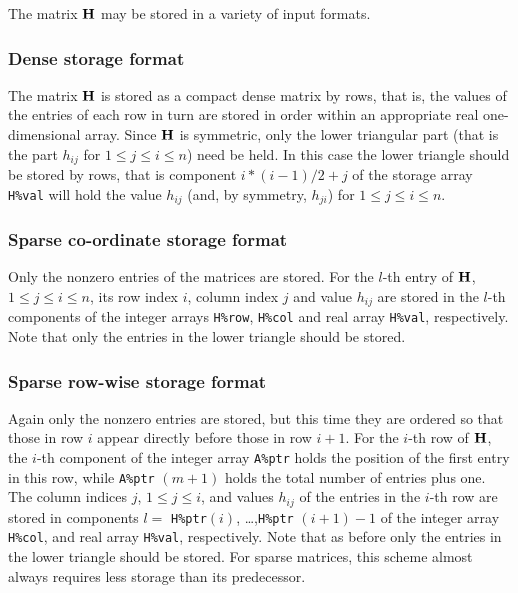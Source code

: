 \documentclass{galahad}
\begin{document}
\galmatrix
The matrix ${\mathbf{H}}$ may be stored in a variety of input formats.

\subsubsection{Dense storage format}\label{dense}
The matrix ${\mathbf{H}}$ is stored as a compact
dense matrix by rows, that is, the values of the entries of each row in turn are
stored in order within an appropriate real one-dimensional array.
Since ${\mathbf{H}}$ is symmetric, only the lower triangular part (that is the part
$h_{ij}$ for $1 \leq j \leq i \leq n$) need be held. In this case
the lower triangle should be stored by rows, that is
component $i \ast (i-1)/2 + j$ of the storage array {\tt H\%val}
will hold the value $h_{ij}$ (and, by symmetry, $h_{ji}$)
for $1 \leq j \leq i \leq n$.

\subsubsection{Sparse co-ordinate storage format}\label{coordinate}
Only the nonzero entries of the matrices are stored.
For the $l$-th entry of ${\mathbf{H}}$, $1 \leq j \leq i \leq n$,
its row index $i$, column index $j$ and value $h_{ij}$
are stored in the $l$-th components of the integer arrays {\tt H\%row},
{\tt H\%col} and real array {\tt H\%val}, respectively.
Note that only the entries in the lower triangle should be stored.

\subsubsection{Sparse row-wise storage format}\label{rowwise}
Again only the nonzero entries are stored, but this time
they are ordered so that those in row $i$ appear directly before those
in row $i+1$. For the $i$-th row of ${\mathbf{H}}$, the $i$-th component of the
integer array {\tt A\%ptr} holds the position of the first entry in this row,
while {\tt A\%ptr} $(m+1)$ holds the total number of entries plus one.
The column indices $j$, $1 \leq j \leq i$, and values $h_{ij}$ of the
entries in the $i$-th row are stored in components
$l =$ {\tt H\%ptr}$(i)$, \ldots ,{\tt H\%ptr} $(i+1)-1$ of the
integer array {\tt H\%col}, and real array {\tt H\%val}, respectively.
Note that as before only the entries in the lower triangle should be stored.
For sparse matrices, this scheme almost always requires less storage than
its predecessor.

\end{document}
